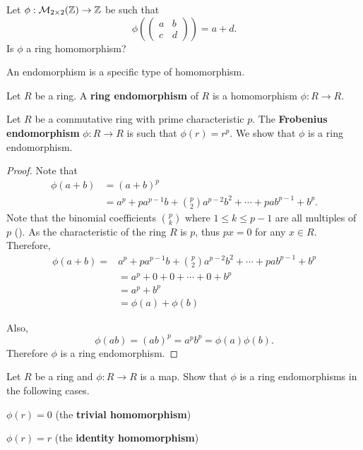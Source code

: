 \begin{exercise}
    Let $\phi: \mathcal{M}_{2\times2}(\mathbb{Z}) \to \mathbb{Z}$ be such that
    \[
        \phi\left(\begin{pmatrix}a&b\\c&d\end{pmatrix}\right) = a+d.
    \]
    Is $\phi$ a ring homomorphism?
\end{exercise}

An endomorphism is a specific type of homomorphism.
\begin{definition}
    Let $R$ be a ring. A \textbf{ring endomorphism} of $R$ is a homomorphism $\phi: R \to R$.
\end{definition}
\begin{example}
    Let $R$ be a commutative ring with prime characteristic $p$. The \textbf{Frobenius endomorphism} $\phi: R \to R$ is such that $\phi(r) = r^p$. We show that $\phi$ is a ring endomorphism.
    
    \begin{proof}
        Note that
        \begin{align*}
            \phi(a+b) &= (a+b)^p\\
            &= a^p + pa^{p-1}b + {p \choose 2}a^{p-2}b^2 + \cdots + pab^{p-1} + b^p.
        \end{align*}
        Note that the binomial coefficients ${p \choose k}$ where $1 \leq k \leq p -1$ are all multiples of $p$ (). As the characteristic of the ring $R$ is $p$, thus $px = 0$ for any $x \in R$. Therefore,
        \begin{align*}
            \phi(a+b) = &a^p + pa^{p-1}b + {p \choose 2}a^{p-2}b^2 + \cdots + pab^{p-1} + b^p\\
            &= a^p + 0 + 0 + \cdots + 0 + b^p\\
            &= a^p + b^p\\
            &=\phi(a) + \phi(b)
        \end{align*}

        Also,
        \[
            \phi(ab) = (ab)^p = a^pb^p = \phi(a)\phi(b).
        \]
        Therefore $\phi$ is a ring endomorphism.
    \end{proof}
\end{example}

\begin{exercise}
    Let $R$ be a ring and $\phi: R \to R$ is a map. Show that $\phi$ is a ring endomorphisms in the following cases.
    \begin{partquestions}{\alph*}
        \item $\phi(r) = 0$ (the \textbf{trivial homomorphism})
        \item $\phi(r) = r$ (the \textbf{identity homomorphism})
    \end{partquestions}
\end{exercise}

